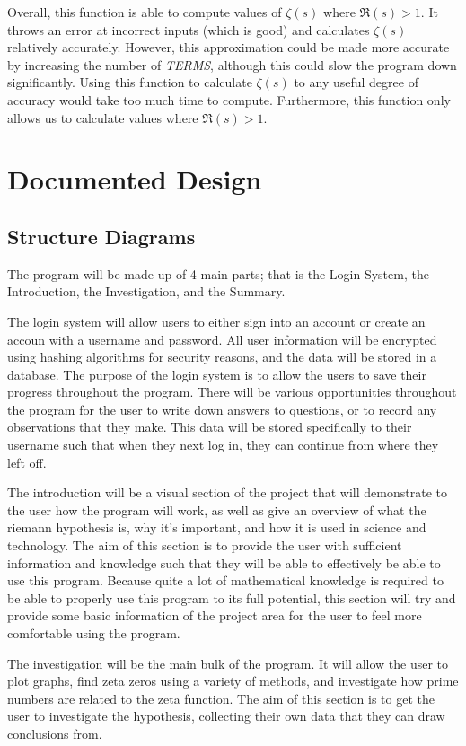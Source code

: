 \documentclass{article}
\begin{document}
Overall, this function is able to compute values of $\zeta(s)$ where $\Re(s) > 1$. It throws an error at incorrect inputs (which is good) and calculates $\zeta(s)$ relatively accurately. However, this approximation could be made more accurate by increasing the number of \textit{TERMS}, although this could slow the program down significantly. Using this function to calculate $\zeta(s)$ to any useful degree of accuracy would take too much time to compute. Furthermore, this function only allows us to calculate values where $\Re(s) > 1$.

\clearpage
\section{Documented Design}

\subsection{Structure Diagrams}

The program will be made up of 4 main parts; that is the Login System, the Introduction, the Investigation, and the Summary.

The login system will allow users to either sign into an account or create an accoun with a username and password. All user information will be encrypted using hashing algorithms for security reasons, and the data will be stored in a database. The purpose of the login system is to allow the users to save their progress throughout the program. There will be various opportunities throughout the program for the user to write down answers to questions, or to record any observations that they make. This data will be stored specifically to their username such that when they next log in, they can continue from where they left off.

The introduction will be a visual section of the project that will demonstrate to the user how the program will work, as well as give an overview of what the riemann hypothesis is, why it's important, and how it is used in science and technology. The aim of this section is to provide the user with sufficient information and knowledge such that they will be able to effectively be able to use this program. Because quite a lot of mathematical knowledge is required to be able to properly use this program to its full potential, this section will try and provide some basic information of the project area for the user to feel more comfortable using the program.

The investigation will be the main bulk of the program. It will allow the user to plot graphs, find zeta zeros using a variety of methods, and investigate how prime numbers are related to the zeta function. The aim of this section is to get the user to investigate the hypothesis, collecting their own data that they can draw conclusions from.
\end{document}
